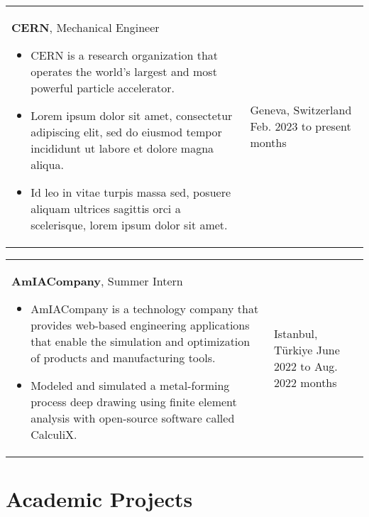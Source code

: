 \documentclass[10pt, a4paper]{article}
\newenvironment{highlights}{
        \begin{itemize}[
                topsep=0pt,
                parsep=0.07 cm,
                partopsep=0pt,
                itemsep=0pt,
                after=\vspace*{-1\baselineskip},
                leftmargin=0.6 cm + 3pt
            ]
    }{
        \end{itemize}
    } %
\begin{document}
        \begin{tabularx}{ cm-0.13cm}{K{0.2 cm} R{3.6 cm}}
            \textbf{CERN}, Mechanical Engineer
            \vspace*{0.12 cm}
            \begin{highlights}
                \item CERN is a research organization that operates the world's largest and most powerful particle accelerator. 
                \item Lorem ipsum dolor sit amet, consectetur adipiscing elit, sed do eiusmod tempor incididunt ut labore et dolore magna aliqua. 
                \item Id leo in vitae turpis massa sed, posuere aliquam ultrices sagittis orci a scelerisque, lorem ipsum dolor sit amet. \hspace*{-0.2cm}
            \end{highlights}
        &
            Geneva, Switzerland \newline
            Feb. 2023 to present  months
        \end{tabularx}

        \vspace*{0.12 cm}
        
        \begin{tabularx}{ cm-0.13cm}{K{0.2 cm} R{3.6 cm}}
            \textbf{AmIACompany}, Summer Intern
            \vspace*{0.12 cm}
            \begin{highlights}
                \item AmIACompany is a technology company that provides web-based engineering applications that enable the simulation and optimization of products and manufacturing tools. 
                \item Modeled and simulated a metal-forming process deep drawing using finite element analysis with open-source software called CalculiX. \hspace*{-0.2cm}
            \end{highlights}
        &
            Istanbul, Türkiye \newline
            June 2022 to Aug. 2022  months
        \end{tabularx}



    \section{Academic Projects}
    
\end{document}

